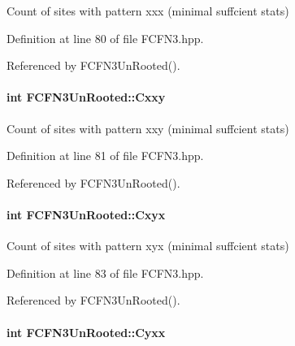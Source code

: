 \-Count of sites with pattern xxx (minimal suffcient stats) 



\-Definition at line 80 of file \-F\-C\-F\-N3.\-hpp.



\-Referenced by \-F\-C\-F\-N3\-Un\-Rooted().

\hypertarget{classFCFN3UnRooted_a9ef322fbaba733780643eb3f748c61e8}{
\paragraph[{\-Cxxy}]{\setlength{\rightskip}{0pt plus 5cm}int {\bf \-F\-C\-F\-N3\-Un\-Rooted\-::\-Cxxy}}}\label{classFCFN3UnRooted_a9ef322fbaba733780643eb3f748c61e8}


\-Count of sites with pattern xxy (minimal suffcient stats) 



\-Definition at line 81 of file \-F\-C\-F\-N3.\-hpp.



\-Referenced by \-F\-C\-F\-N3\-Un\-Rooted().

\hypertarget{classFCFN3UnRooted_aee129a305aebfe530f9025bdc5a64c22}{
\paragraph[{\-Cxyx}]{\setlength{\rightskip}{0pt plus 5cm}int {\bf \-F\-C\-F\-N3\-Un\-Rooted\-::\-Cxyx}}}\label{classFCFN3UnRooted_aee129a305aebfe530f9025bdc5a64c22}


\-Count of sites with pattern xyx (minimal suffcient stats) 



\-Definition at line 83 of file \-F\-C\-F\-N3.\-hpp.



\-Referenced by \-F\-C\-F\-N3\-Un\-Rooted().

\hypertarget{classFCFN3UnRooted_a8a1912c84680898ee998bfcc8e59cab2}{
\paragraph[{\-Cyxx}]{\setlength{\rightskip}{0pt plus 5cm}int {\bf \-F\-C\-F\-N3\-Un\-Rooted\-::\-Cyxx}}}\label{classFCFN3UnRooted_a8a1912c84680898ee998bfcc8e59cab2}


